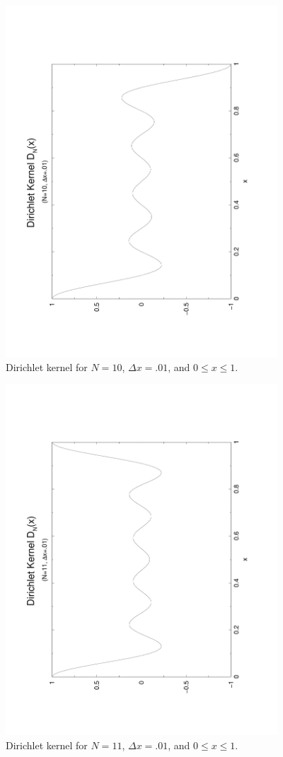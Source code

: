 \documentclass{article}
\begin{document}
\begin{figure}[htb!]
\begin{center}
\noindent\includegraphics[angle=-90,width=4in]{fig1}
\caption{\label{f:fig1}
Dirichlet kernel for $N=10$, $\Delta x =.01$, and $0\le x\le 1$.}
\end{center}
\end{figure}
%
\begin{figure}[htb!]
\begin{center}
\noindent\includegraphics[angle=-90,width=4in]{fig2}
\caption{\label{f:fig2}
Dirichlet kernel for $N=11$, $\Delta x =.01$, and $0\le x\le 1$.}
\end{center}
\end{figure}
\end{document}
